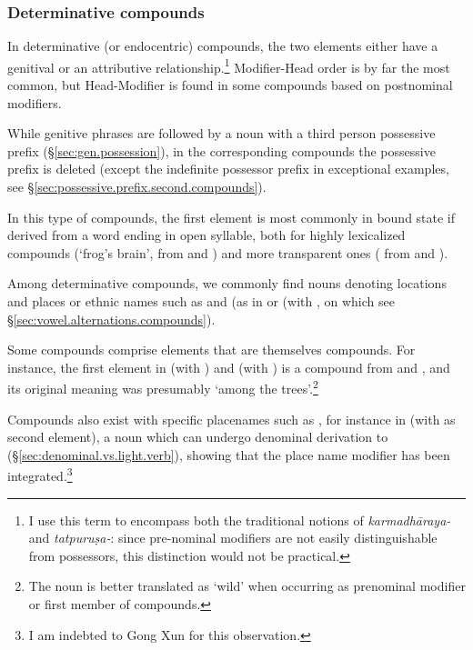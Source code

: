 \subsubsection{Determinative compounds} \label{sec:determinative.n.n}
In determinative (or endocentric) compounds, the two elements either have a genitival or an attributive relationship.\footnote{I use this term to encompass both the traditional notions of \textit{karmadhāraya-} and \hbox{\textit{tatpuruṣa-}:} since pre-nominal modifiers are not easily distinguishable from possessors, this distinction would not be practical. } Modifier-Head order is by far the most common, but Head-Modifier is found in some compounds based on postnominal modifiers.

While genitive phrases are followed by a noun with a third person possessive prefix (§\ref{sec:gen.possession}), in the corresponding compounds the possessive prefix is deleted (except the indefinite possessor prefix in exceptional examples, see §\ref{sec:possessive.prefix.second.compounds}).

In this type of compounds, the first element is most commonly in bound state if derived from a word ending in open syllable, both for highly lexicalized compounds  (`frog's brain', from  and ) and more transparent ones ( from  and ). 

Among determinative compounds, we commonly find nouns denoting locations and places or ethnic names such as  and  (as in  or (with , on which see §\ref{sec:vowel.alternations.compounds}). 

Some compounds comprise elements that are themselves compounds. For instance, the first element  in  (with ) and  (with )
is a compound from  and , and its original meaning was presumably `among the trees'.\footnote{The noun  is better translated as `wild' when occurring as prenominal modifier or first member of compounds.}

Compounds also exist with specific placenames such as , for instance in  (with  as second element), a noun which can undergo denominal derivation to  (§\ref{sec:denominal.vs.light.verb}), showing that the place name modifier has been integrated.\footnote{I am indebted to Gong Xun for this observation. }

